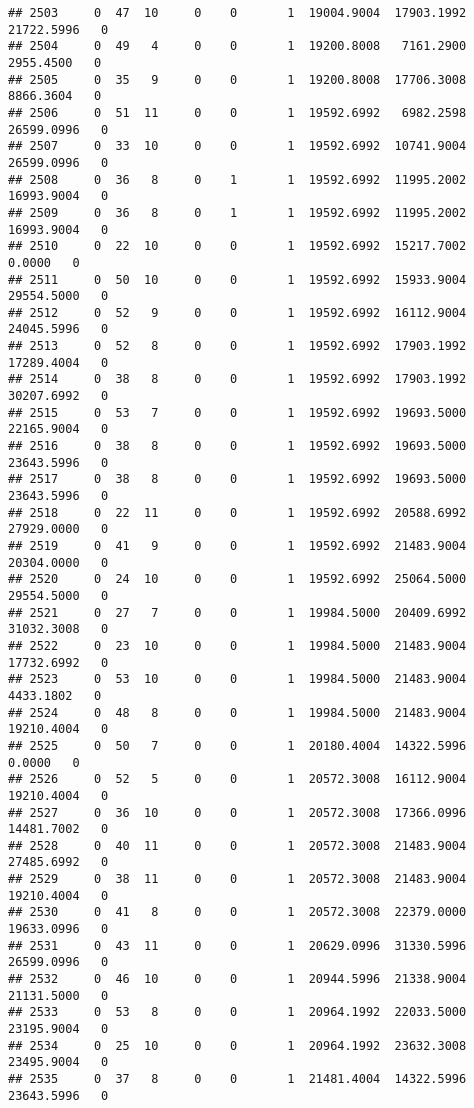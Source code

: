 \documentclass[
]{article}
\begin{document}
\begin{enumerate}
\begin{verbatim}
## 2503     0  47  10     0    0       1  19004.9004  17903.1992  21722.5996   0
## 2504     0  49   4     0    0       1  19200.8008   7161.2900   2955.4500   0
## 2505     0  35   9     0    0       1  19200.8008  17706.3008   8866.3604   0
## 2506     0  51  11     0    0       1  19592.6992   6982.2598  26599.0996   0
## 2507     0  33  10     0    0       1  19592.6992  10741.9004  26599.0996   0
## 2508     0  36   8     0    1       1  19592.6992  11995.2002  16993.9004   0
## 2509     0  36   8     0    1       1  19592.6992  11995.2002  16993.9004   0
## 2510     0  22  10     0    0       1  19592.6992  15217.7002      0.0000   0
## 2511     0  50  10     0    0       1  19592.6992  15933.9004  29554.5000   0
## 2512     0  52   9     0    0       1  19592.6992  16112.9004  24045.5996   0
## 2513     0  52   8     0    0       1  19592.6992  17903.1992  17289.4004   0
## 2514     0  38   8     0    0       1  19592.6992  17903.1992  30207.6992   0
## 2515     0  53   7     0    0       1  19592.6992  19693.5000  22165.9004   0
## 2516     0  38   8     0    0       1  19592.6992  19693.5000  23643.5996   0
## 2517     0  38   8     0    0       1  19592.6992  19693.5000  23643.5996   0
## 2518     0  22  11     0    0       1  19592.6992  20588.6992  27929.0000   0
## 2519     0  41   9     0    0       1  19592.6992  21483.9004  20304.0000   0
## 2520     0  24  10     0    0       1  19592.6992  25064.5000  29554.5000   0
## 2521     0  27   7     0    0       1  19984.5000  20409.6992  31032.3008   0
## 2522     0  23  10     0    0       1  19984.5000  21483.9004  17732.6992   0
## 2523     0  53  10     0    0       1  19984.5000  21483.9004   4433.1802   0
## 2524     0  48   8     0    0       1  19984.5000  21483.9004  19210.4004   0
## 2525     0  50   7     0    0       1  20180.4004  14322.5996      0.0000   0
## 2526     0  52   5     0    0       1  20572.3008  16112.9004  19210.4004   0
## 2527     0  36  10     0    0       1  20572.3008  17366.0996  14481.7002   0
## 2528     0  40  11     0    0       1  20572.3008  21483.9004  27485.6992   0
## 2529     0  38  11     0    0       1  20572.3008  21483.9004  19210.4004   0
## 2530     0  41   8     0    0       1  20572.3008  22379.0000  19633.0996   0
## 2531     0  43  11     0    0       1  20629.0996  31330.5996  26599.0996   0
## 2532     0  46  10     0    0       1  20944.5996  21338.9004  21131.5000   0
## 2533     0  53   8     0    0       1  20964.1992  22033.5000  23195.9004   0
## 2534     0  25  10     0    0       1  20964.1992  23632.3008  23495.9004   0
## 2535     0  37   8     0    0       1  21481.4004  14322.5996  23643.5996   0

\end{verbatim}
\end{enumerate}
\end{document}
